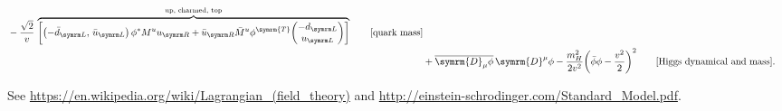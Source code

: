 \documentclass{article}
\def\dD{\symrm{D}}
\def\trans{{\symrm{T}}}
\begin{document}
\begin{align}
     {} - \frac{\sqrt{2}}{v} \,
          \overbrace{\qty[  \qty(-\bar{d}_\L,\,\bar{u}_\L) \, \phi^* M^u u_\R
                          + \bar{u}_\R \bar{M}^u \phi^\trans \mqty(-d_\L \\ u_\L)]}%
            ^{\text{up, charmed, top}}
        \tag*{[quark mass]} \\
    &{} + \overline{\dD_\mu\phi} \, \dD^\mu\phi
        - \frac{m_H^2}{2v^2} \qty(\bar{\phi}\phi-\frac{v^2}{2})^2
        \tag*{[Higgs dynamical and mass]}.
\end{align}
\endgroup

See \url{https://en.wikipedia.org/wiki/Lagrangian_(field_theory)} and
\url{http://einstein-schrodinger.com/Standard_Model.pdf}.
\end{document}
